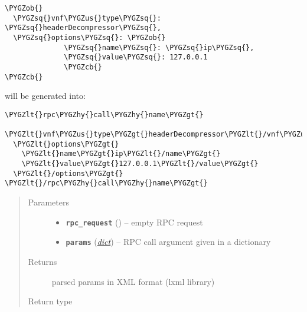 \documentclass[letterpaper,10pt,english]{sphinxmanual}
\def\PYGZus{\char`\_}
\def\PYGZob{\char`\{}
\def\PYGZcb{\char`\}}
\def\PYGZlt{\char`\<}
\def\PYGZgt{\char`\>}
\def\PYGZhy{\char`\-}
\def\PYGZsq{\char`\'}
\renewcommand\PYGZsq{\textquotesingle}
\begin{document}
\begin{fulllineitems}
\begin{fulllineitems}
\begin{Verbatim}[commandchars=\\\{\}]
\PYGZob{}
  \PYGZsq{}vnf\PYGZus{}type\PYGZsq{}: \PYGZsq{}headerDecompressor\PYGZsq{},
  \PYGZsq{}options\PYGZsq{}: \PYGZob{}
              \PYGZsq{}name\PYGZsq{}: \PYGZsq{}ip\PYGZsq{},
              \PYGZsq{}value\PYGZsq{}: 127.0.0.1
              \PYGZcb{}
\PYGZcb{}
\end{Verbatim}

will be generated into:

\begin{Verbatim}[commandchars=\\\{\}]
\PYGZlt{}rpc\PYGZhy{}call\PYGZhy{}name\PYGZgt{}
  \PYGZlt{}vnf\PYGZus{}type\PYGZgt{}headerDecompressor\PYGZlt{}/vnf\PYGZus{}type\PYGZgt{}
  \PYGZlt{}options\PYGZgt{}
    \PYGZlt{}name\PYGZgt{}ip\PYGZlt{}/name\PYGZgt{}
    \PYGZlt{}value\PYGZgt{}127.0.0.1\PYGZlt{}/value\PYGZgt{}
  \PYGZlt{}/options\PYGZgt{}
\PYGZlt{}/rpc\PYGZhy{}call\PYGZhy{}name\PYGZgt{}
\end{Verbatim}
\begin{quote}\begin{description}
\item[{Parameters}] \leavevmode\begin{itemize}
\item {} 
\textbf{\texttt{rpc\_request}} () -- empty RPC request

\item {} 
\textbf{\texttt{params}} (\href{https://docs.python.org/2.7/library/stdtypes.html\#dict}{\emph{dict}}) -- RPC call argument given in a dictionary

\end{itemize}

\item[{Returns}] \leavevmode
parsed params in XML format (lxml library)

\item[{Return type}] \leavevmode
{}

\end{description}\end{quote}

\end{fulllineitems}



\end{fulllineitems}
\end{document}
